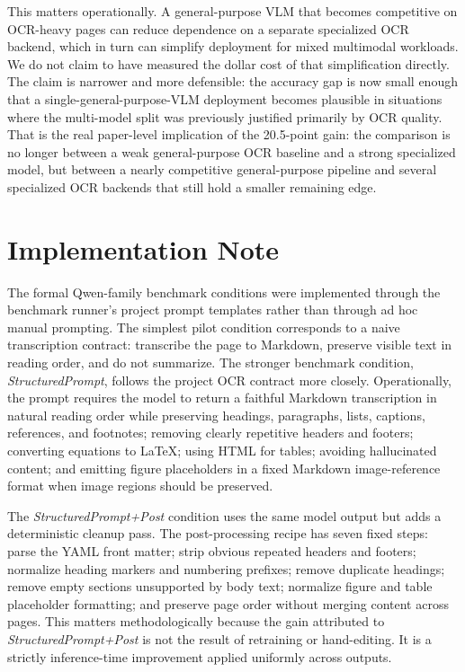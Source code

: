 \documentclass[conference]{IEEEtran}
\newcommand{\papername}[1]{\textit{#1}}
\begin{document}
This matters operationally. A general-purpose VLM that becomes competitive on OCR-heavy pages can reduce dependence on a separate specialized OCR backend, which in turn can simplify deployment for mixed multimodal workloads. We do not claim to have measured the dollar cost of that simplification directly. The claim is narrower and more defensible: the accuracy gap is now small enough that a single-general-purpose-VLM deployment becomes plausible in situations where the multi-model split was previously justified primarily by OCR quality. That is the real paper-level implication of the 20.5-point gain: the comparison is no longer between a weak general-purpose OCR baseline and a strong specialized model, but between a nearly competitive general-purpose pipeline and several specialized OCR backends that still hold a smaller remaining edge.

\section{Implementation Note}

The formal Qwen-family benchmark conditions were implemented through the benchmark runner's project prompt templates rather than through ad hoc manual prompting. The simplest pilot condition corresponds to a naive transcription contract: transcribe the page to Markdown, preserve visible text in reading order, and do not summarize. The stronger benchmark condition, \papername{StructuredPrompt}, follows the project OCR contract more closely. Operationally, the prompt requires the model to return a faithful Markdown transcription in natural reading order while preserving headings, paragraphs, lists, captions, references, and footnotes; removing clearly repetitive headers and footers; converting equations to LaTeX; using HTML for tables; avoiding hallucinated content; and emitting figure placeholders in a fixed Markdown image-reference format when image regions should be preserved.

The \papername{StructuredPrompt+Post} condition uses the same model output but adds a deterministic cleanup pass. The post-processing recipe has seven fixed steps: parse the YAML front matter; strip obvious repeated headers and footers; normalize heading markers and numbering prefixes; remove duplicate headings; remove empty sections unsupported by body text; normalize figure and table placeholder formatting; and preserve page order without merging content across pages. This matters methodologically because the gain attributed to \papername{StructuredPrompt+Post} is not the result of retraining or hand-editing. It is a strictly inference-time improvement applied uniformly across outputs.
\end{document}
